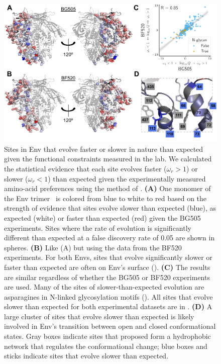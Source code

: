 \documentclass[9pt]{elife}
\begin{document}
\begin{figure}
\includegraphics[width=1.0\textwidth]{figures/omegabysite_structural_analysis/omegabysite_structural_analysis.pdf}
\caption{\label{fig:divsel}
Sites in Env that evolve faster or slower in nature than expected given the functional constraints measured in the lab.
We calculated the statistical evidence that each site evolves faster ($\omega_r > 1$) or slower ($\omega_r < 1$) than expected given the experimentally measured amino-acid preferences using the method of \citet{bloom2017identification}.
{\bf (A)}
One monomer of the Env trimer~\citep[PDB 5FYL;][]{stewart2016trimeric} is colored from blue to white to red based on the strength of evidence that sites evolve slower than expected (blue), as expected (white) or faster than expected (red) given the BG505 experiments.
Sites where the rate of evolution is significantly different than expected at a false discovery rate of 0.05 are shown in spheres.
{\bf (B)}
Like (A) but using the data from the BF520 experiments.
For both Envs, sites that evolve significantly slower or faster than expected are often on Env's surface ().
{\bf (C)}
The results are similar regardless of whether the BG505 or BF520 experiments are used.
Many of the sites of slower-than-expected evolution are asparagines in N-linked glycosylation motifs ().
All sites that evolve slower than expected for both experimental datasets are in .
{\bf (D)} 
A large cluster of sites that evolve slower than expected is likely involved in Env's transition between open and closed conformational states.
Gray boxes indicate sites that \citet[PDB 5VN3]{ozorowski2017open} proposed form a hydrophobic network that regulates the conformational change; blue boxes and sticks indicate sites that evolve slower than expected.
}
\end{figure}
\end{document}
